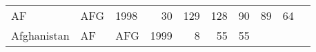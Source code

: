 \documentclass[]{article}
\begin{document}
\begin{longtable}[]{@{}lllrrrrrrr@{}}
\begin{minipage}[t]{0.04\columnwidth}
AF\strut
\end{minipage} & \begin{minipage}[t]{0.04\columnwidth}\raggedright\strut
AFG\strut
\end{minipage} & \begin{minipage}[t]{0.04\columnwidth}\raggedleft\strut
1998\strut
\end{minipage} & \begin{minipage}[t]{0.08\columnwidth}\raggedleft\strut
30\strut
\end{minipage} & \begin{minipage}[t]{0.09\columnwidth}\raggedleft\strut
129\strut
\end{minipage} & \begin{minipage}[t]{0.09\columnwidth}\raggedleft\strut
128\strut
\end{minipage} & \begin{minipage}[t]{0.09\columnwidth}\raggedleft\strut
90\strut
\end{minipage} & \begin{minipage}[t]{0.09\columnwidth}\raggedleft\strut
89\strut
\end{minipage} & \begin{minipage}[t]{0.09\columnwidth}\raggedleft\strut
64\strut
\end{minipage}\tabularnewline
\begin{minipage}[t]{0.08\columnwidth}\raggedright\strut
Afghanistan\strut
\end{minipage} & \begin{minipage}[t]{0.04\columnwidth}\raggedright\strut
AF\strut
\end{minipage} & \begin{minipage}[t]{0.04\columnwidth}\raggedright\strut
AFG\strut
\end{minipage} & \begin{minipage}[t]{0.04\columnwidth}\raggedleft\strut
1999\strut
\end{minipage} & \begin{minipage}[t]{0.08\columnwidth}\raggedleft\strut
8\strut
\end{minipage} & \begin{minipage}[t]{0.09\columnwidth}\raggedleft\strut
55\strut
\end{minipage} & \begin{minipage}[t]{0.09\columnwidth}\raggedleft\strut
55\strut
\end{minipage} & \begin{minipage}[t]{0.09\columnwidth}\raggedleft\strut

\end{minipage}
\end{longtable}
\end{document}
